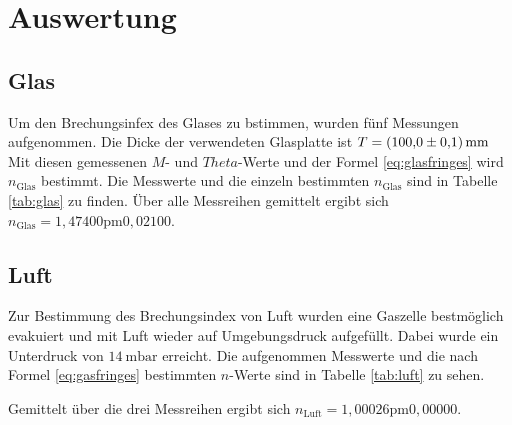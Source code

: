 \section{Auswertung}
\label{sec:Auswertung}
\subsection{Glas}
Um den Brechungsinfex des Glases zu bstimmen, wurden fünf Messungen aufgenommen. Die Dicke der verwendeten Glasplatte ist $T=\SI{100\pm 0,1}{\milli\meter}$
Mit diesen gemessenen $M$- und $Theta$-Werte und der Formel \eqref{eq:glasfringes} wird $n_\text{Glas}$ bestimmt. Die Messwerte und die einzeln bestimmten
 $n_\text{Glas}$ sind in Tabelle \ref{tab:glas} zu finden.
Über alle Messreihen gemittelt ergibt sich $n_\text{Glas}=\si{1,47400\pm 0,02100}$.

\subsection{Luft}
Zur Bestimmung des Brechungsindex von Luft wurden eine Gaszelle bestmöglich evakuiert und mit Luft wieder auf Umgebungsdruck aufgefüllt. Dabei wurde ein
Unterdruck von $\SI{14}{\milli \bar}$ erreicht. Die aufgenommen Messwerte und die nach Formel \eqref{eq:gasfringes} bestimmten $n$-Werte sind in Tabelle \ref{tab:luft} zu sehen.

Gemittelt über die drei Messreihen ergibt sich $n_\text{Luft}=\si{1,00026 \pm 0,00000}$.
